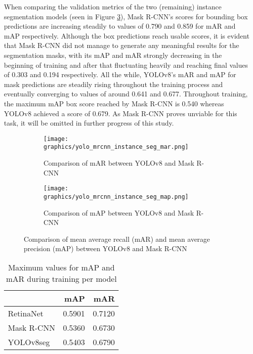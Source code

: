 \documentclass[draft,final]{vutinfth} %
\begin{document}
\begin{appendix}
When comparing the validation metrics of the two (remaining) instance segmentation models (seen in Figure \ref{fig:yolo_mrcnn_instance_seg}), Mask R-CNN's scores for bounding box predictions are increasing steadily to values of 0.790 and 0.859 for mAR and mAP respectively. Although the box predictions reach usable scores, it is evident that Mask R-CNN did not manage to generate any meaningful results for the segmentation masks, with its mAP and mAR strongly decreasing in the beginning of training and after that fluctuating heavily and reaching final values of 0.303 and 0.194 respectively. All the while, YOLOv8's mAR and mAP for mask predictions are steadily rising throughout the training process and eventually converging to values of around 0.641 and 0.677. Throughout training, the maximum mAP box score reached by Mask R-CNN is 0.540 whereas YOLOv8 achieved a score of 0.679. As Mask R-CNN proves unviable for this task, it will be omitted in further progress of this study.


\begin{figure}[]
    \centering
    \begin{subfigure}{0.48\textwidth}
        \texttt{[image: graphics/yolo\_mrcnn\_instance\_seg\_mar.png]}
        \caption{Comparison of mAR between YOLOv8 and Mask R-CNN}
        \label{fig:yolo_mrcnn_instance_seg_mar}
    \end{subfigure}
    \hfill
    \begin{subfigure}{0.48\textwidth}
        \texttt{[image: graphics/yolo\_mrcnn\_instance\_seg\_map.png]}
        \caption{Comparison of mAP between YOLOv8 and Mask R-CNN}
        \label{fig:yolo_mrcnn_instance_seg_map}
    \end{subfigure}
    \caption{Comparison of mean average recall (mAR) and mean average precision (mAP) between YOLOv8 and Mask R-CNN}
    \label{fig:yolo_mrcnn_instance_seg}
\end{figure}

\begin{table}[]
    \centering
    \begin{tabular}{lrr}
        \toprule
        & mAP & mAR \\
        \midrule
        RetinaNet & 0.5901 &  0.7120 \\
        Mask R-CNN & 0.5360 &  0.6730 \\
        YOLOv8seg & 0.5403  & 0.6790 \\
        \bottomrule
    \end{tabular}
    \caption{Maximum values for mAP and mAR during training per model}
    \label{tab:instance_segmentation_max_values}
\end{table}



\end{appendix}
\end{document}
